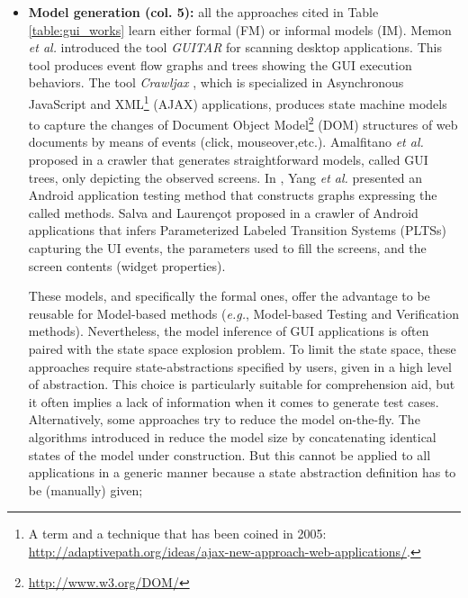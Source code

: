 \begin{itemize}
	\item \textbf{Model generation (col. 5):} all the approaches
	cited in Table \ref{table:gui_works} learn either formal
	(FM) or informal models (IM). Memon \emph{et al.} \cite{guitar}
	introduced the tool \textit{GUITAR} for scanning desktop
	applications. This tool produces event flow graphs and trees
	showing the GUI execution behaviors. The tool
	\textit{Crawljax} \cite{crawljax:tweb12}, which is
	specialized in Asynchronous JavaScript and XML\footnote{A term and a technique that has been coined in 2005: \url{http://adaptivepath.org/ideas/ajax-new-approach-web-applications/}.} (AJAX) applications, produces state machine
	models to capture the changes of Document Object Model\footnote{\url{http://www.w3.org/DOM/}} (DOM)
	structures of web documents by means of events (click,
	mouseover,etc.).
	Amalfitano \emph{et al.} proposed in
	\cite{Amalfitano:2012:UGR:2351676.2351717} a crawler that
	generates straightforward models, called GUI trees, only
	depicting the observed screens. In \cite{WPX13}, Yang \emph{et al.}
	presented an Android application testing method that
	constructs graphs expressing the called methods. Salva and
	Laurençot proposed in \cite{SP15} a crawler of Android
	applications that infers Parameterized Labeled Transition
    Systems (PLTSs) capturing the UI events, the parameters used
    to fill the screens, and the screen contents (widget
	properties).

    These models, and specifically the formal ones, offer the
    advantage to be reusable for Model-based methods
    (\emph{e.g.}, Model-based Testing and Verification methods).
    Nevertheless, the model inference of GUI applications is often
    paired with the state space explosion problem. To limit the
    state space, these approaches
    \cite{MobiGUITARIEEESoftware2014,guitar,5954416,WPX13,SP15}
    require state-abstractions specified by users, given in a
    high level of abstraction. This choice is particularly
    suitable for comprehension aid, but it often implies a lack
    of information when it comes to generate test cases.
    Alternatively, some approaches try to reduce the model
    on-the-fly. The algorithms introduced in
    \cite{crawljax:tweb12,4656395} reduce the model size by
    concatenating identical states of the model under
    construction.  But this cannot be applied to all
    applications in a generic manner because a state abstraction
    definition has to be (manually) given;


\end{itemize}
